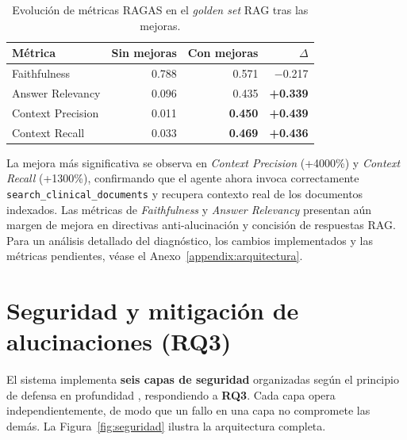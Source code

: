 \begin{table}[H]
\centering
\caption{Evolución de métricas \acs{RAGAS} en el \textit{golden set} \acs{RAG} tras las mejoras.}
\label{tab:rag_evolucion}
\footnotesize
\begin{tabularx}{\columnwidth}{lrrr}
\toprule
\textbf{Métrica} & \textbf{Sin mejoras} & \textbf{Con mejoras} & \textbf{$\Delta$} \\
\midrule
Faithfulness & 0.788 & 0.571 & $-$0.217 \\
Answer Relevancy & 0.096 & 0.435 & \textbf{+0.339} \\
Context Precision & 0.011 & \textbf{0.450} & \textbf{+0.439} \\
Context Recall & 0.033 & \textbf{0.469} & \textbf{+0.436} \\
\bottomrule
\end{tabularx}
\end{table}

La mejora más significativa se observa en \textit{Context Precision} (+4000\%) y \textit{Context Recall} (+1300\%), confirmando que el agente ahora invoca correctamente \texttt{search\_clinical\_documents} y recupera contexto real de los documentos indexados. Las métricas de \textit{Faithfulness} y \textit{Answer Relevancy} presentan aún margen de mejora en directivas anti-alucinación y concisión de respuestas \ac{RAG}. Para un análisis detallado del diagnóstico, los cambios implementados y las métricas pendientes, véase el Anexo~\ref{appendix:arquitectura}.

\section{Seguridad y mitigación de alucinaciones (\acs{RQ}3)}
\label{sec:seguridad}

El sistema implementa \textbf{seis capas de seguridad} organizadas según el principio de defensa en profundidad \parencite{OWASP2023llm}, respondiendo a \textbf{RQ3}. Cada capa opera independientemente, de modo que un fallo en una capa no compromete las demás. La Figura~\ref{fig:seguridad} ilustra la arquitectura completa.

